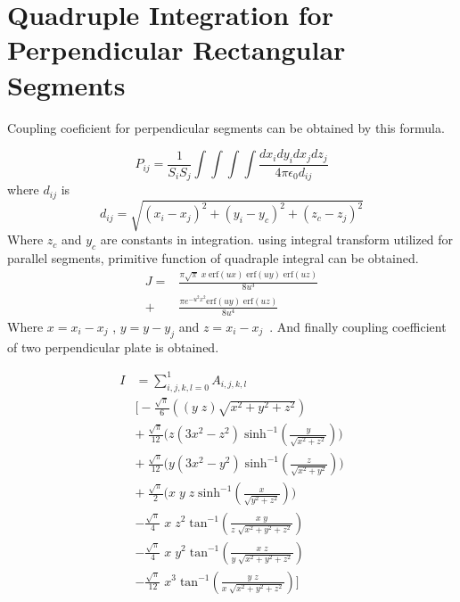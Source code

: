 \documentclass[final,5p,times,twocolumn]{elsarticle}
\begin{document}
\section{Quadruple Integration for Perpendicular Rectangular Segments}
Coupling coeficient for perpendicular segments can be obtained by this formula.

\begin{equation}
\label {eq21}
P_{ij} = \frac 1 {S_i S_j}\int \int \int \int \frac{dx_i dy_i dx_j dz_j}{4 \pi \epsilon_0 d_{ij}}
\end{equation} 
where $d _{ij}$ is 
\begin{equation}
\label {eq22}
d_{ij} = \sqrt{(x_i-x_j)^2 + (y_i-y_c)^2 + (z_c - z_j)^2}
\end{equation} 
Where $z_c$ and $y_c$ are constants in integration. using integral transform utilized for parallel segments, primitive function of quadraple integral can be obtained.
\begin{equation}
\label {eq23}
\begin{split}
J = &\frac{\pi\sqrt{\pi}\;x\; \mathrm {erf}(u x)\; \mathrm {erf}(u y)\; \mathrm {erf}(u z)}{8u^3}\\
+\; &\frac{\pi e^{-u^2 x^2} \mathrm{erf}(u y)\; \mathrm{erf}(u z)}{8u^4}
\end{split}
\end{equation}
Where $x = x_i - x_j$ , $y = y - y_j$ and $z = x_i - x_j$\ .
And finally coupling coefficient of two perpendicular plate is obtained.

\begin{equation}\label {eq:24}
\begin{split}
I& = \sum_{i,j,k,l=0}^1 A_{i,j,k,l}\\
&  \bigg[ -\frac {\sqrt{\pi} } {6} \left((y\; z)\sqrt{x^2 + y^2 + z^2} \right) \\
& +\  \frac {\sqrt{\pi} } {12} \bigg( z(3x^2 - z^2)\;\mathrm{sinh^{-1}}(\frac{y}{\sqrt{x^2 + z^2}}) \bigg)\\
& +\  \frac {\sqrt{\pi} } {12} \bigg( y(3x^2 - y^2)\;\mathrm{sinh^{-1}}(\frac{z}{\sqrt{x^2 + y^2}}) \bigg)\\
& +\  \frac {\sqrt{\pi} } {2} \bigg( x\; y\; z\;\mathrm{sinh^{-1}}(\frac{x}{\sqrt{y^2 + z^2}}) \bigg)\\
&-  \frac {\sqrt{\pi} } {4}\;x \;z^2\;\mathrm{tan^{-1}}(\frac{x\;y}{z\;\sqrt{x^2+y^2 + z^2}})\\
&-  \frac {\sqrt{\pi} } {4}\;x \;y^2\;\mathrm{tan^{-1}}(\frac{x\;z}{y\;\sqrt{x^2+y^2 + z^2}})\\
&-  \frac {\sqrt{\pi} } {12}\;x^3\;\mathrm{tan^{-1}}(\frac{y\;z}{x\;\sqrt{x^2+y^2 + z^2}})\bigg]
\end{split}
\end{equation}
\end{document}
